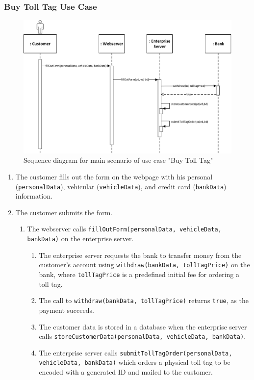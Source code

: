 \subsubsection{Buy Toll Tag Use Case}

\begin{figure}
\centerline{\includegraphics[width=1.2\textwidth]{"img/sequence_diagrams/sequence_diagram_buy_toll_tag"}}
\caption{Sequence diagram for main scenario of use case "Buy Toll Tag"}
\label{fig:seq_buy_toll_tag}
\end{figure}

\begin{enumerate}
\item The customer fills out the form on the webpage with his personal (\texttt{personalData}), vehicular (\texttt{vehicleData}), and credit card (\texttt{bankData}) information.
\item The customer submits the form.
	\begin{enumerate}
	\item The webserver calls \texttt{fillOutForm(personalData, vehicleData, bankData)} on the enterprise server.
		\begin{enumerate}
		\item The enterprise server requests the bank to transfer money from the customer's account using \texttt{withdraw(bankData, tollTagPrice)} on the bank, where \texttt{tollTagPrice} is a predefined initial fee for ordering a toll tag. 
		\item The call to \texttt{withdraw(bankData, tollTagPrice)} returns \texttt{true}, as the payment succeeds.
		\item The customer data is stored in a database when the enterprise server calls \texttt{storeCustomerData(personalData, vehicleData, bankData)}.
		\item The enterprise server calls \texttt{submitTollTagOrder(personalData, vehicleData, bankData)} which orders a physical toll tag to be encoded with a generated ID and mailed to the customer.
		\end{enumerate}
	\end{enumerate}
\end{enumerate}